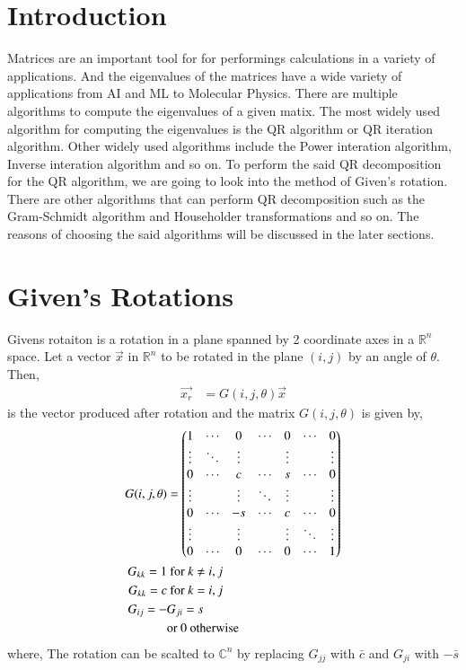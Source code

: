 \documentclass[journal]{IEEEtran}
\numberwithin{equation}{section}
\begin{document}
\section{Introduction}

Matrices are an important tool for for performings calculations in a variety of applications. And the eigenvalues of the matrices have a wide variety of applications from AI and ML to Molecular Physics. There are multiple algorithms to compute the eigenvalues of a given matix. The most widely used algorithm for computing the eigenvalues is the QR algorithm or QR iteration algorithm. Other widely used algorithms include the Power interation algorithm, Inverse interation algorithm and so on. To perform the said QR decomposition for the QR algorithm, we are going to look into the method of Given's rotation. There are other algorithms that can perform QR decomposition such as the Gram-Schmidt algorithm and Householder transformations and so on. The reasons of choosing the said algorithms will be discussed in the later sections.

\section{Given's Rotations}

Givens rotaiton is a rotation in a plane spanned by 2 coordinate axes in a $\mathbb{R}^n$ space. Let a vector $\vec{x}$ in $\mathbb{R}^n$ to be rotated in the plane $(i, j)$ by an angle of $\theta$. Then,
\begin{align}
    \vec{x_r} &= G(i, j, \theta) \vec{x}
\end{align}
is the vector produced after rotation and the matrix $G(i,j,\theta)$ is given by,
\begin{align}
    G(i,j,\theta) &= \begin{pmatrix}1 & \cdots & 0 & \cdots & 0 & \cdots & 0\\\vdots & \ddots & \vdots & & \vdots & & \vdots \\0 & \cdots & c & \cdots & s & \cdots & 0 \\ \vdots & & \vdots & \ddots & \vdots & & \vdots \\ 0 & \cdots & -s & \cdots & c & \cdots & 0 \\ \vdots & & \vdots & & \vdots & \ddots & \vdots \\0 & \cdots & 0 & \cdots & 0 & \cdots & 1\end{pmatrix}\\
    G_{kk} = 1 & \text{ for } k \neq i, j\\
    G_{kk} = c & \text{ for } k = i, j\\
    G_{ij} = -&G_{ji} = s\\
    &\text{or 0 otherwise}
\end{align}
where,
The rotation can be scalted to $\mathbb{C}^n$ by replacing $G_{jj}$ with $\bar{c}$ and $G_{ji}$ with $-\bar{s}$
\end{document}
